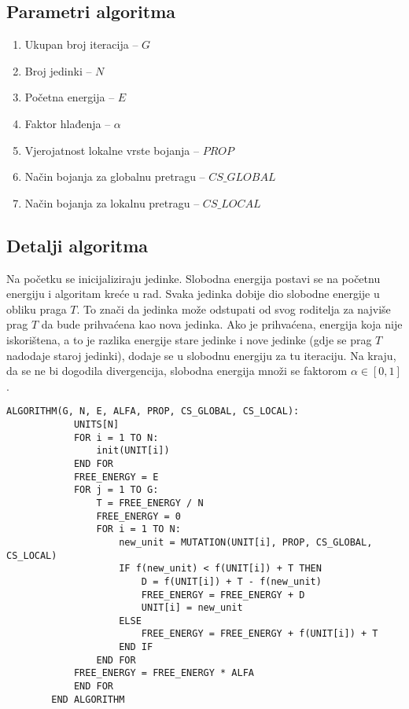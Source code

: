 \documentclass[times, utf8, diplomski, numeric]{fer}
\begin{document}
\subsection{Parametri algoritma}

\begin{enumerate}
	\item Ukupan broj iteracija -- $G$
	\item Broj jedinki -- $N$
	\item Početna energija -- $E$
	\item Faktor hlađenja -- $\alpha$
	\item Vjerojatnost lokalne vrste bojanja -- $PROP$
	\item Način bojanja za globalnu pretragu -- $CS\_GLOBAL$
	\item Način bojanja za lokalnu pretragu -- $CS\_LOCAL$
\end{enumerate}


\subsection{Detalji algoritma}

Na početku se inicijaliziraju jedinke. Slobodna energija postavi se na početnu energiju i algoritam kreće u rad. Svaka jedinka dobije dio slobodne energije u obliku praga $T$. To znači da jedinka može odstupati od svog roditelja za najviše prag $T$ da bude prihvaćena kao nova jedinka. Ako je prihvaćena, energija koja nije iskorištena, a to je razlika energije stare jedinke i nove jedinke (gdje se prag $T$ nadodaje staroj jedinki), dodaje se u slobodnu energiju za tu iteraciju. Na kraju, da se ne bi dogodila divergencija, slobodna energija množi se faktorom $\alpha \in [0,1]$.  

\begin{singlespace}
	\begin{lstlisting}[caption=Pseudok\^{o}d genetskog kaljenja]
		ALGORITHM(G, N, E, ALFA, PROP, CS_GLOBAL, CS_LOCAL):
			UNITS[N]
			FOR i = 1 TO N:
				init(UNIT[i])
			END FOR
			FREE_ENERGY = E
			FOR j = 1 TO G:
				T = FREE_ENERGY / N
				FREE_ENERGY = 0
				FOR i = 1 TO N:
					new_unit = MUTATION(UNIT[i], PROP, CS_GLOBAL, CS_LOCAL)
					IF f(new_unit) < f(UNIT[i]) + T THEN
						D = f(UNIT[i]) + T - f(new_unit)
						FREE_ENERGY = FREE_ENERGY + D
						UNIT[i] = new_unit
					ELSE
						FREE_ENERGY = FREE_ENERGY + f(UNIT[i]) + T
					END IF
				END FOR
			FREE_ENERGY = FREE_ENERGY * ALFA
			END FOR
		END ALGORITHM
	\end{lstlisting}
\end{singlespace}
\end{document}
